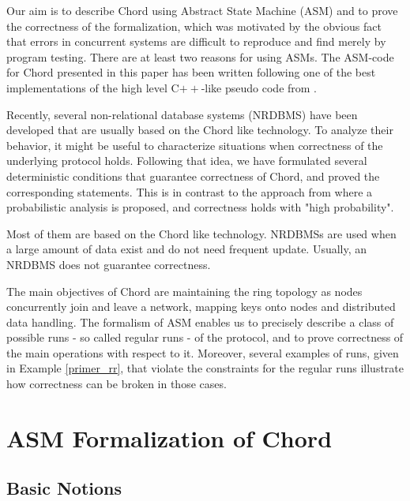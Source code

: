 \documentclass{amsart}
\theoremstyle{definition}
\begin{document}
Our aim is to describe Chord using Abstract State Machine (ASM)
\cite{GUR95} and to prove the correctness of the formalization,
which was motivated by the obvious fact that errors in concurrent
systems are difficult to reproduce and find merely by program
testing. There are at least two reasons for using ASMs. 
The ASM-code for Chord presented in this paper has been written
following one of the best implementations \cite{Bamberg} of the
high level C$++$-like pseudo code from \cite{Chord-IEEE}.


Recently, several non-relational database systems (NRDBMS) have
been developed \cite{LaM10, bigtable} that are usually based on
the Chord like technology. To analyze their behavior, it might be
useful to characterize situations when correctness of the
underlying protocol holds. Following that idea, we have formulated
several deterministic conditions that guarantee correctness of
Chord, and proved the corresponding statements. This is in
contrast to the approach from
\cite{Chord,Chord-TR,Chord-IEEE,liben02} where a probabilistic
analysis is proposed, and correctness holds with "high
probability".

 Most of them are based on the Chord like technology. NRDBMSs are
 used when a large amount of data exist and do not need frequent
 update. Usually, an NRDBMS does not guarantee correctness.
 
The main objectives of Chord are maintaining the ring topology as
nodes concurrently join and leave a network, mapping keys onto
nodes and distributed data handling.
The formalism of ASM enables us to precisely describe a class of
possible runs - so called regular runs - of the protocol, and to
prove correctness of the main operations with respect to it.
Moreover, several examples of runs, given in Example
\ref{primer_rr}, that violate the constraints for the regular runs
illustrate how correctness can be broken in those cases.


\section{ASM Formalization of Chord}
\label{formal_chord}

\subsection{Basic Notions}
\end{document}
